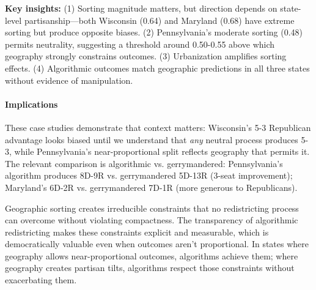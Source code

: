 \textbf{Key insights:} (1) Sorting magnitude matters, but direction depends on state-level partisanship---both Wisconsin (0.64) and Maryland (0.68) have extreme sorting but produce opposite biases. (2) Pennsylvania's moderate sorting (0.48) permits neutrality, suggesting a threshold around 0.50-0.55 above which geography strongly constrains outcomes. (3) Urbanization amplifies sorting effects. (4) Algorithmic outcomes match geographic predictions in all three states without evidence of manipulation.

\paragraph{Implications}

These case studies demonstrate that context matters: Wisconsin's 5-3 Republican advantage looks biased until we understand that \textit{any} neutral process produces 5-3, while Pennsylvania's near-proportional split reflects geography that permits it. The relevant comparison is algorithmic vs. gerrymandered: Pennsylvania's algorithm produces 8D-9R vs. gerrymandered 5D-13R (3-seat improvement); Maryland's 6D-2R vs. gerrymandered 7D-1R (more generous to Republicans).

Geographic sorting creates irreducible constraints that no redistricting process can overcome without violating compactness. The transparency of algorithmic redistricting makes these constraints explicit and measurable, which is democratically valuable even when outcomes aren't proportional. In states where geography allows near-proportional outcomes, algorithms achieve them; where geography creates partisan tilts, algorithms respect those constraints without exacerbating them.
